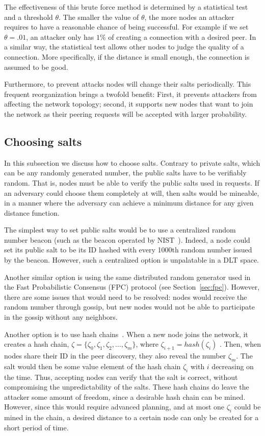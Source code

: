 \documentclass[../main.tex]{subfiles}
\begin{document}
The effectiveness of this brute force method is determined by a statistical test and a threshold $\theta$.  The smaller the value of $\theta$, the more nodes an attacker requires to have a reasonable chance of being successful. For example if we set $\theta=.01$, an attacker only has $1\%$ of creating a connection with a desired peer. In a similar way, the statistical test allows other nodes to judge the quality of a connection. More specifically, if the distance is small enough, the connection is assumed to be good.


Furthermore, to prevent attacks nodes will change their salts periodically.  This frequent reorganization brings a twofold benefit: First, it prevents attackers from affecting the network topology; second, it supports new nodes that want to join the network as their peering requests will be accepted with larger probability.


\subsection{Choosing salts}
\label{sec:salt}

In this subsection we discuss how to choose salts.  Contrary to private salts, which can be any randomly generated number, the public salts have to be verifiably random. That is, nodes must be able to verify the public salts used in requests.  If an adversary could choose them completely at will, then salts would be mineable, in a manner where the adversary can achieve a minimum distance for any given distance function.  

The simplest way to set public salts would be to use a centralized random number beacon (such as the beacon operated by NIST~\cite{nist:2019}). Indeed, a node could set its public salt to be its ID hashed with every 1000th random number issued by the beacon. However, such a centralized option is unpalatable in a DLT space.

Another similar option is using the same distributed random generator used in the Fast Probabilistic Consensus (FPC) protocol (see Section~\ref{sec:fpc}).  However, there are some issues that would need to be resolved: nodes would receive the random number through gossip, but new nodes would not be able to participate in the gossip without any neighbors.  

Another option is to use hash chains~\cite{lamport1981password}.  When a new node joins the network, it creates a hash chain, $\zeta=\{\zeta_0,\zeta_1,\zeta_2,\dots,\zeta_m\}$, where $\zeta_{i+1}=hash(\zeta_i)$ . Then, when nodes share their ID in the peer discovery, they also reveal the number $\zeta_m$. The salt would then be some value element of the hash chain $\zeta_i$ with $i$ decreasing on the time. Thus, accepting nodes can verify that the salt is correct, without compromising the  unpredictability of the salts.  These hash chains do leave the attacker some amount of freedom, since a desirable hash chain can be mined.  However, since this would require advanced planning, and at most one $\zeta_i$ could be mined in the chain, a desired distance to a certain node can only be created for a short period of time.   
\end{document}
